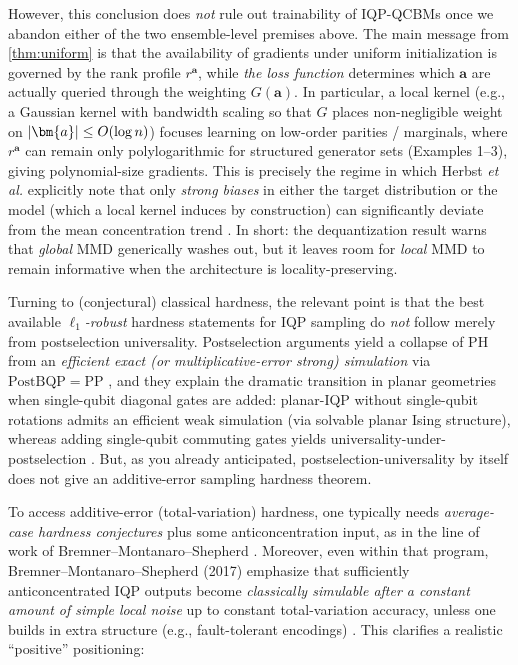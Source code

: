 \documentclass[a4paper,onecolumn,notitlepage,nofootinbib,longbibliography,superscriptaddress, floatfix, pra, aps, 10pt]{revtex4-2}
\newcommand{\vta}{{\bm{a}}}
\begin{document}
However, this conclusion does \emph{not} rule out trainability of IQP-QCBMs once we abandon either of the two ensemble-level premises above. The main message from \cref{thm:uniform} is that the availability of gradients under uniform initialization is governed by the rank profile $r^\vta$, while \emph{the loss function} determines which $\vta$ are actually queried through the weighting $G(\vta)$. In particular, a local kernel (e.g., a Gaussian kernel with bandwidth scaling so that $G$ places non-negligible weight on $\abs{\vta}\le O(\log n)$) focuses learning on low-order parities / marginals, where $r^\vta$ can remain only polylogarithmic for structured generator sets (Examples 1--3), giving polynomial-size gradients. This is precisely the regime in which Herbst \emph{et al.} explicitly note that only \emph{strong biases} in either the target distribution or the model (which a local kernel induces by construction) can significantly deviate from the mean concentration trend \cite[discussion around Prop.~6]{herbst25}. In short: the dequantization result warns that \emph{global} MMD generically washes out, but it leaves room for \emph{local} MMD to remain informative when the architecture is locality-preserving.

Turning to (conjectural) classical hardness, the relevant point is that the best available \emph{$\ell_1$-robust} hardness statements for IQP sampling do \emph{not} follow merely from postselection universality. Postselection arguments yield a collapse of PH from an \emph{efficient exact (or multiplicative-error strong) simulation} via $\mathrm{PostBQP}=\mathrm{PP}$ \cite{aaronson05}, and they explain the dramatic transition in planar geometries when single-qubit diagonal gates are added: planar-IQP without single-qubit rotations admits an efficient weak simulation (via solvable planar Ising structure), whereas adding single-qubit commuting gates yields universality-under-postselection \cite[items (ii) and the discussion thereafter]{fujiiMorimae16}. But, as you already anticipated, postselection-universality by itself does not give an additive-error sampling hardness theorem.

To access additive-error (total-variation) hardness, one typically needs \emph{average-case hardness conjectures} plus some anticoncentration input, as in the line of work of Bremner--Montanaro--Shepherd \cite{bms16approx}. Moreover, even within that program, Bremner--Montanaro--Shepherd (2017) emphasize that sufficiently anticoncentrated IQP outputs become \emph{classically simulable after a constant amount of simple local noise} up to constant total-variation accuracy, unless one builds in extra structure (e.g., fault-tolerant encodings) \cite[Abstract]{bms17sparse}. This clarifies a realistic ``positive'' positioning:
\end{document}
